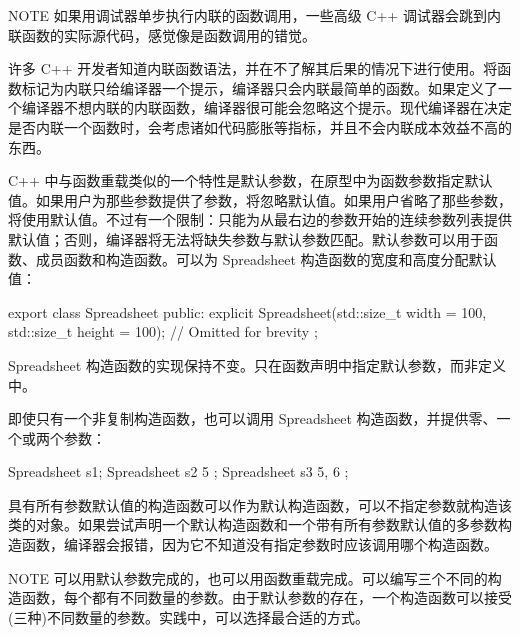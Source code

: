 \begin{myNotic}{NOTE}
如果用调试器单步执行内联的函数调用，一些高级 C++ 调试器会跳到内联函数的实际源代码，感觉像是函数调用的错觉。
\end{myNotic}

许多 C++ 开发者知道内联函数语法，并在不了解其后果的情况下进行使用。将函数标记为内联只给编译器一个提示，编译器只会内联最简单的函数。如果定义了一个编译器不想内联的内联函数，编译器很可能会忽略这个提示。现代编译器在决定是否内联一个函数时，会考虑诸如代码膨胀等指标，并且不会内联成本效益不高的东西。


C++ 中与函数重载类似的一个特性是默认参数，在原型中为函数参数指定默认值。如果用户为那些参数提供了参数，将忽略默认值。如果用户省略了那些参数，将使用默认值。不过有一个限制：只能为从最右边的参数开始的连续参数列表提供默认值；否则，编译器将无法将缺失参数与默认参数匹配。默认参数可以用于函数、成员函数和构造函数。可以为 Spreadsheet 构造函数的宽度和高度分配默认值：

\begin{cpp}
export class Spreadsheet
{
    public:
        explicit Spreadsheet(std::size_t width = 100, std::size_t height = 100);
        // Omitted for brevity
};
\end{cpp}

Spreadsheet 构造函数的实现保持不变。只在函数声明中指定默认参数，而非定义中。

即使只有一个非复制构造函数，也可以调用 Spreadsheet 构造函数，并提供零、一个或两个参数：

\begin{cpp}
Spreadsheet s1;
Spreadsheet s2 { 5 };
Spreadsheet s3 { 5, 6 };
\end{cpp}

具有所有参数默认值的构造函数可以作为默认构造函数，可以不指定参数就构造该类的对象。如果尝试声明一个默认构造函数和一个带有所有参数默认值的多参数构造函数，编译器会报错，因为它不知道没有指定参数时应该调用哪个构造函数。

\begin{myNotic}{NOTE}
可以用默认参数完成的，也可以用函数重载完成。可以编写三个不同的构造函数，每个都有不同数量的参数。由于默认参数的存在，一个构造函数可以接受(三种)不同数量的参数。实践中，可以选择最合适的方式。
\end{myNotic}














